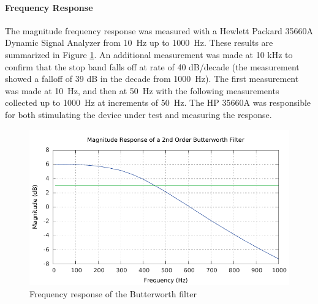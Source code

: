\documentclass[justified,nobib]{tufte-handout}
\begin{document}
\paragraph{Frequency Response} The magnitude frequency response was
measured with a Hewlett Packard 35660A Dynamic Signal Analyzer from 10~Hz up to
1000~Hz. These results are summarized in Figure \ref{freqr}. An additional
measurement was made at 10 kHz to confirm that the stop band falls off at rate
of 40 dB/decade (the measurement showed a falloff of 39 dB in the decade from
1000~Hz). The first measurement was made at 10~Hz, and then at 50~Hz with
the following measurements collected up to 1000~Hz at increments of 50~Hz. The
HP 35660A was responsible for both stimulating the device under test and
measuring the response.
\begin{figure}
\centering
\label{freqr}
\includegraphics[width=0.81\linewidth]{magResponse.pdf}
\caption{Frequency response of the Butterworth filter}
\end{figure}
{}

\end{document}

